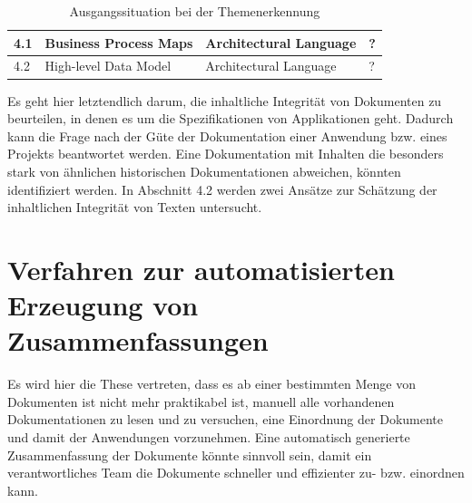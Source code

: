 \begin{table}[h]
\begin{tabular}{|l|l|l|l|}
4.1              & Business Process Maps                                                                 & Architectural Language    & ?                         \\ \hline
4.2              & High-level Data Model                                                                 & Architectural Language    & ?                         \\ \hline
\end{tabular}

\caption{Ausgangssituation bei der Themenerkennung}
\label{tab:themenerkennung}

\end{table}

Es geht hier letztendlich darum, die inhaltliche Integrität von Dokumenten zu beurteilen, in denen es um die Spezifikationen von Applikationen geht. Dadurch kann die Frage nach der Güte der Dokumentation einer Anwendung bzw. eines Projekts beantwortet werden. Eine Dokumentation mit Inhalten die besonders stark von ähnlichen historischen Dokumentationen abweichen, könnten identifiziert werden. In Abschnitt 4.2 werden zwei Ansätze zur Schätzung der inhaltlichen Integrität von Texten untersucht.

\section{Verfahren zur automatisierten Erzeugung von Zusammenfassungen}

Es wird hier die These vertreten, dass es ab einer bestimmten Menge von Dokumenten ist nicht mehr praktikabel ist, manuell alle vorhandenen Dokumentationen zu lesen und zu versuchen, eine Einordnung der Dokumente und damit der Anwendungen vorzunehmen. Eine automatisch generierte Zusammenfassung der Dokumente könnte sinnvoll sein, damit ein verantwortliches Team die Dokumente schneller und effizienter zu- bzw. einordnen kann.

